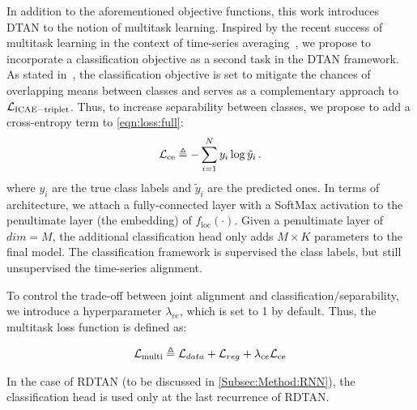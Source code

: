 In addition to the aforementioned objective functions, this work introduces DTAN to the notion of multitask learning. 
Inspired by the recent success of multitask learning in the context of time-series averaging~\cite{terefe:ICTAI:2020:time}, 
we propose to incorporate a classification objective as a second task in the DTAN framework.
As stated in~\cite{terefe:ICTAI:2020:time}, the classification objective is set to mitigate the chances 
of overlapping means between classes and serves as a complementary approach to $\mathcal{L}_{\mathrm{ICAE-triplet}}$. Thus, to increase separability between classes, we propose to add a
cross-entropy term to \autoref{eqn:loss:full}:
\begin{equation}
    \label{eqn:ce}
    \mathcal{L}_{\mathrm{ce}} \triangleq -\sum_{i=1}^{N} y_i \log \tilde{y}_i \, .
\end{equation}
where $y_i$ are the true class labels and $\tilde{y}_i$ are the predicted ones.
In terms of architecture, we attach a fully-connected layer with a SoftMax activation to the penultimate layer (\ie the embedding) of $f_{\mathrm{loc}}(\cdot)$.
Given a penultimate layer of $dim=M$, the additional classification head only adds $M\times K$ parameters to the final model. 
The classification framework is supervised \wrt the class labels, 
but still unsupervised \wrt the time-series alignment.

To control the trade-off between joint alignment and classification/separability, we introduce a hyperparameter $\lambda_{ce}$,
which is set to 1 by default. Thus, the multitask loss function is defined as:

\begin{align}
    \mathcal{L}_{\mathrm{multi}} \triangleq 
    \mathcal{L}_{data} + \mathcal{L}_{reg}+ \lambda_{ce} \mathcal{L}_{\mathrm{ce}}
\end{align}

In the case of RDTAN (to be discussed in \autoref{Subsec:Method:RNN}), the classification head is 
used only at the last recurrence of RDTAN.
